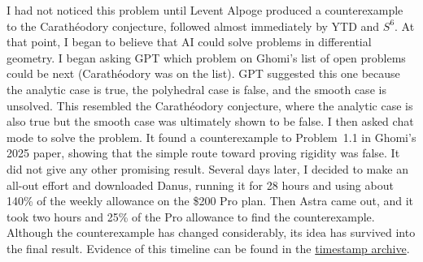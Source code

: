 I had not noticed this problem until Levent Alpoge produced a
counterexample to the Carath\'eodory conjecture, followed almost immediately
by YTD and $S^6$. At that point, I began to believe that AI could solve
problems in differential geometry. I began asking GPT which problem on
Ghomi's list of open problems could be next (Carath\'eodory was on the
list). GPT suggested this one because the analytic case is true, the
polyhedral case is false, and the smooth case is unsolved. This resembled
the Carath\'eodory conjecture, where the analytic case is also true but the
smooth case was ultimately shown to be false. I then asked chat mode to
solve the problem. It found a counterexample to Problem~1.1 in Ghomi's
2025 paper, showing that the simple route toward proving rigidity was
false. It did not give any other promising result. Several days later,
I decided to make an all-out effort and downloaded Danus, running it for
28 hours and using about 140\% of the weekly allowance on the \$200 Pro
plan. Then Astra came out, and it took two hours and 25\% of the Pro
allowance to find the counterexample. Although the counterexample has
changed considerably, its idea has survived into the final result.
Evidence of this timeline can be found in the
\href{https://github.com/zhangyuetong/smooth-tight-nonrigidity/blob/main/timestamp/README.md}{timestamp archive}.


